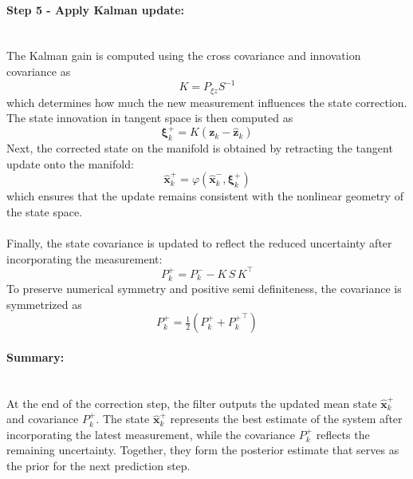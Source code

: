 \paragraph{Step 5 - Apply Kalman update:} \mbox{}\\[0.5em] \noindent
The Kalman gain is computed using the cross covariance and innovation covariance as
$$
    K = P_{\xi z} S^{-1}
$$
which determines how much the new measurement influences the state correction. The state innovation in tangent space is then computed as
$$
    \boldsymbol{\xi}_k^{+} = K(\mathbf{z}_k - \hat{\mathbf{z}}_k)
$$
Next, the corrected state on the manifold is obtained by retracting the tangent update onto the manifold:
$$
    \hat{\mathbf{x}}_{k}^{+} = \varphi(\hat{\mathbf{x}}_{k}^{-}, \boldsymbol{\xi}_k^{+})
$$
which ensures that the update remains consistent with the nonlinear geometry of the state space.
\\ \\
Finally, the state covariance is updated to reflect the reduced uncertainty after incorporating the measurement:
$$
    P_k^{+} = P_k^{-} - K \, S \, K^\top
$$
To preserve numerical symmetry and positive semi definiteness, the covariance is symmetrized as
$$
    P_k^{+} = \tfrac{1}{2}(P_k^{+} + {P_k^{+}}^\top)
$$

\paragraph{Summary:} \mbox{}\\[0.5em] \noindent
At the end of the correction step, the filter outputs the updated mean state $\hat{\mathbf{x}}_{k}^{+}$ and covariance $P_k^{+}$. The state $\hat{\mathbf{x}}_{k}^{+}$ represents the best estimate of the system after incorporating the latest measurement, while the covariance $P_k^{+}$ reflects the remaining uncertainty. Together, they form the posterior estimate that serves as the prior for the next prediction step.



